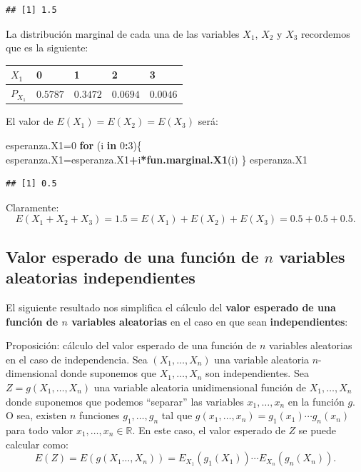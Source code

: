 \documentclass[]{book}
\newenvironment{Shaded}{\begin{snugshade}}{\end{snugshade}}
\newcommand{\ControlFlowTok}[1]{\textcolor[rgb]{0.13,0.29,0.53}{\textbf{#1}}}
\newcommand{\DecValTok}[1]{\textcolor[rgb]{0.00,0.00,0.81}{#1}}
\newcommand{\KeywordTok}[1]{\textcolor[rgb]{0.13,0.29,0.53}{\textbf{#1}}}
\newcommand{\NormalTok}[1]{#1}
\newcommand{\OperatorTok}[1]{\textcolor[rgb]{0.81,0.36,0.00}{\textbf{#1}}}
\begin{document}
\begin{verbatim}
## [1] 1.5
\end{verbatim}

La distribución marginal de cada una de las variables \(X_1\), \(X_2\) y \(X_3\) recordemos que es la siguiente:

\begin{longtable}[]{@{}lllll@{}}
\toprule
\(X_1\) & 0 & 1 & 2 & 3\tabularnewline
\midrule
\endhead
\(P_{X_1}\) & \(0.5787\) & \(0.3472\) & \(0.0694\) & \(0.0046\)\tabularnewline
\bottomrule
\end{longtable}

El valor de \(E(X_1)=E(X_2)=E(X_3)\) será:

\begin{Shaded}
\begin{Highlighting}[]
\NormalTok{esperanza.X1=}\DecValTok{0}
\ControlFlowTok{for}\NormalTok{ (i }\ControlFlowTok{in} \DecValTok{0}\OperatorTok{:}\DecValTok{3}\NormalTok{)\{}
\NormalTok{  esperanza.X1=esperanza.X1}\OperatorTok{+}\NormalTok{i}\OperatorTok{*}\KeywordTok{fun.marginal.X1}\NormalTok{(i)}
\NormalTok{\}}
\NormalTok{esperanza.X1}
\end{Highlighting}
\end{Shaded}

\begin{verbatim}
## [1] 0.5
\end{verbatim}

Claramente:
\[
E(X_1+X_2+X_3)=1.5=E(X_1)+E(X_2)+E(X_3)=0.5+0.5+0.5.
\]

\hypertarget{valor-esperado-de-una-funciuxf3n-de-n-variables-aleatorias-independientes}{%
\subsection{\texorpdfstring{Valor esperado de una función de \(n\) variables aleatorias independientes}{Valor esperado de una función de n variables aleatorias independientes}}\label{valor-esperado-de-una-funciuxf3n-de-n-variables-aleatorias-independientes}}

El siguiente resultado nos simplifica el cálculo del \textbf{valor esperado de una función de \(n\) variables aleatorias} en el caso en que sean \textbf{independientes}:

Proposición: cálculo del valor esperado de una función de \(n\) variables aleatorias en el caso de independencia.
Sea \((X_1,\ldots,X_n)\) una variable aleatoria \(n\)-dimensional donde suponemos que \(X_1,\ldots,X_n\) son independientes.
Sea \(Z=g(X_1,\ldots,X_n)\) una variable aleatoria unidimensional función de \(X_1,\ldots,X_n\) donde suponemos que podemos ``separar'' las variables \(x_1,\ldots, x_n\) en la función \(g\). O sea, existen \(n\) funciones \(g_1,\ldots, g_n\) tal que \(g(x_1,\ldots,x_n)=g_1(x_1)\cdots g_n(x_n)\) para todo valor \(x_1,\ldots,x_n\in\mathbb{R}\). En este caso, el valor esperado de \(Z\) se puede calcular como:
\[
E(Z)=E(g(X_1\ldots,X_n))=E_{X_1}(g_1(X_1))\cdots E_{X_n}(g_n(X_n)).
\]
\end{document}
